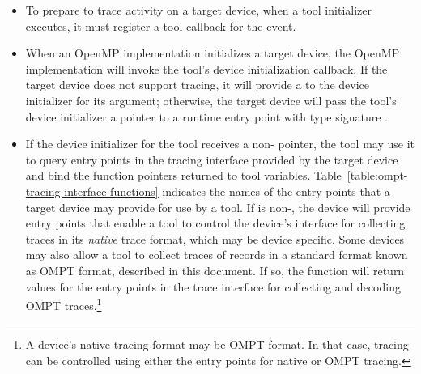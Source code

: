 \begin{itemize}
\item To prepare to trace activity on a target device, when a tool
  initializer executes, it must register a tool callback for the
   event.
\item When an OpenMP implementation initializes a target device, the
  OpenMP implementation will invoke the tool's device initialization
  callback. If the target device does not support tracing, it
  will provide a  to the device initializer for its
   argument; otherwise, the target device will pass the
  tool's device initializer a pointer to a runtime
  entry point with type signature .
\item If the device initializer for the tool receives a
  non-  pointer, the tool may use it to query
  entry points in the tracing interface provided by the target device
  and bind the function pointers returned to tool variables.
  Table~\ref{table:ompt-tracing-interface-functions} indicates the
  names of the entry points that a target device may provide for use
  by a tool.  If  is non-, the device will
  provide entry points that enable a tool to control the device's
  interface for collecting traces in its \emph{native} trace format,
  which may be device specific. Some devices may also allow a tool to
  collect traces of records in a standard format known as OMPT format,
  described in this document. If so, the  function will
  return values for the entry points in the trace interface for
  collecting and decoding OMPT traces.\footnote{A device's native
    tracing format may be OMPT format. In that case, tracing can be
    controlled using either the entry points for native or OMPT
    tracing.}


\end{itemize}
